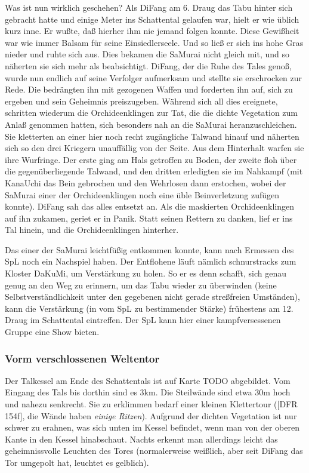 \documentclass[
a4paper,
twoside,
DIV=calc,
BCOR=4mm,
fontsize=9pt,
twocolumn=on,
titlepage=on,
parskip=half
]{scrartcl}
\begin{document}
Was ist nun wirklich geschehen? Als DiFang am 6. Draug das Tabu hinter
sich gebracht hatte und einige Meter ins Schattental gelaufen war,
hielt er wie üblich kurz inne. Er wußte, daß hierher ihm nie jemand
folgen konnte. Diese Gewißheit war wie immer Balsam für seine
Einsiedlerseele. Und so ließ er sich ins hohe Gras nieder und ruhte
sich aus. Dies bekamen die SaMurai nicht gleich mit, und so näherten
sie sich mehr als beabsichtigt. DiFang, der die Ruhe des Tales genoß,
wurde nun endlich auf seine Verfolger aufmerksam und stellte sie
erschrocken zur Rede. Die bedrängten ihn mit gezogenen Waffen und
forderten ihn auf, sich zu ergeben und sein Geheimnis
preiszugeben. Während sich all dies ereignete, schritten wiederum die
Orchideenklingen zur Tat, die die dichte Vegetation zum Anlaß genommen
hatten, sich besonders nah an die SaMurai heranzuschleichen. Sie
kletterten an einer hier noch recht zugängliche Talwand hinauf und
näherten sich so den drei Kriegern unauffällig von der Seite. Aus dem
Hinterhalt warfen sie ihre Wurfringe. Der erste ging am Hals getroffen
zu Boden, der zweite floh über die gegenüberliegende Talwand, und den
dritten erledigten sie im Nahkampf (mit KanaUchi das Bein gebrochen
und den Wehrlosen dann erstochen, wobei der SaMurai einer der
Orchideenklingen noch eine üble Beinverletzung zufügen konnte). DiFang
sah das alles entsetzt an. Als die maskierten Orchideenklingen auf ihn
zukamen, geriet er in Panik. Statt seinen Rettern zu danken, lief er
ins Tal hinein, und die Orchideenklingen hinterher.

Das einer der SaMurai leichtfüßig entkommen konnte, kann nach Ermessen
des SpL noch ein Nachspiel haben. Der Entflohene läuft nämlich
schnurstracks zum Kloster DaKuMi, um Verstärkung zu holen. So er es
denn schafft, sich genau genug an den Weg zu erinnern, um das Tabu
wieder zu überwinden (keine Selbstverständlichkeit unter den gegebenen
nicht gerade streßfreien Umständen), kann die Verstärkung (in vom SpL
zu bestimmender Stärke) frühestens am 12. Draug im Schattental
eintreffen. Der SpL kann hier einer kampfversessenen Gruppe eine Show
bieten.

\subsubsection{Vorm verschlossenen Weltentor}

Der Talkessel am Ende des Schattentals ist auf Karte TODO
abgebildet. Vom Eingang des Tals bis dorthin sind es 3km. Die
Steilwände sind etwa 30m hoch und nahezu senkrecht. Sie zu erklimmen
bedarf einer kleinen Klettertour ([DFR\,154f], die Wände haben
\emph{einige Ritzen}). Aufgrund der dichten Vegetation ist nur schwer
zu erahnen, was sich unten im Kessel befindet, wenn man von der oberen
Kante in den Kessel hinabschaut. Nachts erkennt man allerdings leicht
das geheimnissvolle Leuchten des Tores (normalerweise weißlich, aber
seit DiFang das Tor umgepolt hat, leuchtet es gelblich).
\end{document}
